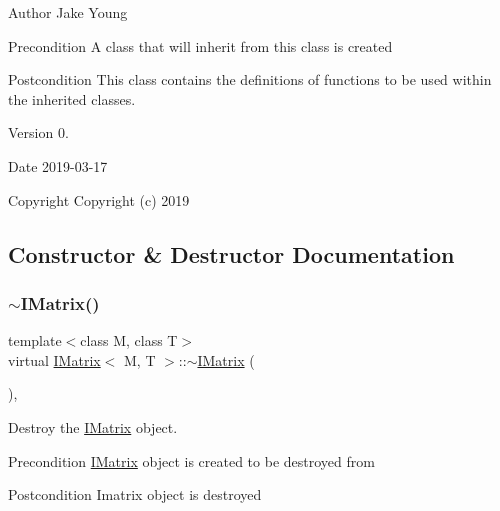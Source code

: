 \begin{DoxyAuthor}{Author}
Jake Young 
\end{DoxyAuthor}
\begin{DoxyPrecond}{Precondition}
A class that will inherit from this class is created 
\end{DoxyPrecond}
\begin{DoxyPostcond}{Postcondition}
This class contains the definitions of functions to be used within the inherited classes. 
\end{DoxyPostcond}
\begin{DoxyVersion}{Version}
0. 
\end{DoxyVersion}
\begin{DoxyDate}{Date}
2019-\/03-\/17
\end{DoxyDate}
\begin{DoxyCopyright}{Copyright}
Copyright (c) 2019 
\end{DoxyCopyright}


\subsection{Constructor \& Destructor Documentation}
\mbox{\label{class_i_matrix_a72b86d932b115897d81b768343aa5dd3}} 
\subsubsection{\texorpdfstring{$\sim$IMatrix()}{~IMatrix()}}
{\footnotesize\ttfamily template$<$class M, class T$>$ \\
virtual \mbox{\hyperlink{class_i_matrix}{I\+Matrix}}$<$ M, T $>$\+::$\sim$\mbox{\hyperlink{class_i_matrix}{I\+Matrix}} (\begin{DoxyParamCaption}{ }\end{DoxyParamCaption})\hspace{0.3cm}{\ttfamily [inline]}, {\ttfamily [virtual]}}



Destroy the \mbox{\hyperlink{class_i_matrix}{I\+Matrix}} object. 

\begin{DoxyPrecond}{Precondition}
\mbox{\hyperlink{class_i_matrix}{I\+Matrix}} object is created to be destroyed from 
\end{DoxyPrecond}
\begin{DoxyPostcond}{Postcondition}
Imatrix object is destroyed 
\end{DoxyPostcond}


